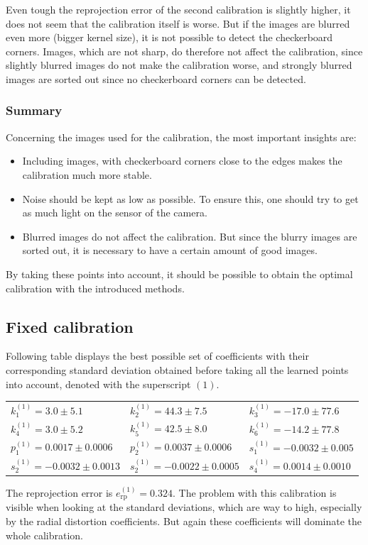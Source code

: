Even tough the reprojection error of the second calibration is slightly higher, it does not seem that the calibration itself is worse.
But if the images are blurred even more (bigger kernel size), it is not possible to detect the checkerboard corners.
Images, which are not sharp, do therefore not affect the calibration, since slightly blurred images do not make the calibration worse, and strongly blurred images are sorted out since no checkerboard corners can be detected.

\subsubsection{Summary}
Concerning the images used for the calibration, the most important insights are:
\begin{itemize}
\item Including images, with checkerboard corners close to the edges makes the calibration much more stable.
\item Noise should be kept as low as possible. To ensure this, one should try to get as much light on the sensor of the camera.
\item Blurred images do not affect the calibration. But since the blurry images are sorted out, it is necessary to have a certain amount of good images.
\end{itemize}
By taking these points into account, it should be possible to obtain the optimal calibration with the introduced methods.

\clearpage
\subsection{Fixed calibration}
Following table displays the best possible set of coefficients with their corresponding standard deviation obtained before taking all the learned points into account, denoted with the superscript $(1)$.
\begin{center}
	\begin{tabular}{lll}
		$k_1^{(1)}=3.0\pm 5.1$&$k_2^{(1)}=44.3\pm 7.5$&$k_3^{(1)}=-17.0\pm 77.6$\\
		$k_4^{(1)}=3.0\pm 5.2$&$k_5^{(1)}=42.5\pm 8.0$&$k_6^{(1)}=-14.2\pm 77.8$\\
		$p_1^{(1)}=0.0017\pm 0.0006$&$p_2^{(1)}=0.0037\pm 0.0006$&$s_1^{(1)}=-0.0032\pm 0.005$\\
		$s_2^{(1)}=-0.0032\pm 0.0013$&$s_2^{(1)}=-0.0022\pm 0.0005$&$s_4^{(1)}=0.0014\pm 0.0010$
	\end{tabular} 
\end{center}
The reprojection error is $e_{\text{rp}}^{(1)}=0.324$.
The problem with this calibration is visible when looking at the standard deviations, which are way to high, especially by the radial distortion coefficients.
But again these coefficients will dominate the whole calibration.

